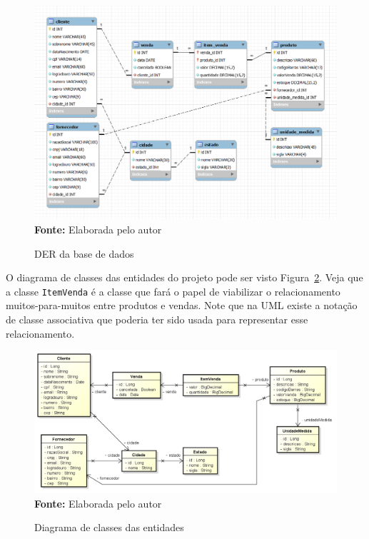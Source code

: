 \FloatBarrier
\begin{figure}[!htbp]
    \centering
    \caption{DER da base de dados}
    \includegraphics[scale=0.5]{imagens/cap08DER}
    \\\textbf{Fonte:} Elaborada pelo autor
    \label{fig:cap08DER}
\end{figure}
\FloatBarrier

O diagrama de classes das entidades do projeto pode ser visto Figura~\ref{fig:cap08DiagramaClasses}. Veja que a classe \texttt{ItemVenda} é a classe que fará o papel de viabilizar o relacionamento muitos-para-muitos entre produtos e vendas. Note que na UML existe a notação de classe associativa que poderia ter sido usada para representar esse relacionamento.

\FloatBarrier
\begin{figure}[!htbp]
    \centering
    \caption{Diagrama de classes das entidades}
    \includegraphics[scale=0.45]{imagens/cap08DiagramaClasses}
    \\\textbf{Fonte:} Elaborada pelo autor
    \label{fig:cap08DiagramaClasses}
\end{figure}
\FloatBarrier

